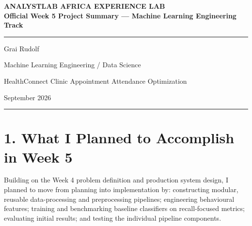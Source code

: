 \documentclass[11pt,a4paper]{article}
\begin{document}
\begin{center}
{\Large\bfseries\color{primary} ANALYSTLAB AFRICA EXPERIENCE LAB}\\[0.2cm]
{\large\bfseries\color{secondary} Official Week 5 Project Summary — Machine Learning Engineering Track}\\[0.4cm]
\rule{\linewidth}{1pt}
\end{center}

\vspace{0.2cm}

\begin{description}[font=\normalfont\bfseries\color{primary}]
    \item[Intern Name:] Grai Rudolf
    \item[Track:] Machine Learning Engineering / Data Science
    \item[Project Title:] HealthConnect Clinic Appointment Attendance Optimization
    \item[Date:] September 2026
\end{description}

\vspace{0.3cm}
\hrule
\vspace{0.5cm}

\section*{1. What I Planned to Accomplish in Week 5}
Building on the Week 4 problem definition and production system design, I planned to move from
planning into implementation by: constructing modular, reusable data-processing and preprocessing
pipelines; engineering behavioural features; training and benchmarking baseline classifiers on
recall-focused metrics; evaluating initial results; and testing the individual pipeline components.
\end{document}
